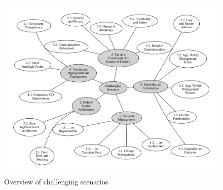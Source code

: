 \begin{figure}[htb]
\begin{center}
\includegraphics[width=\textwidth]{figures/use_cases}
\caption{Overview of challenging scenarios}
\label{fig:challenging-scenarios}
\end{center}
\end{figure}



